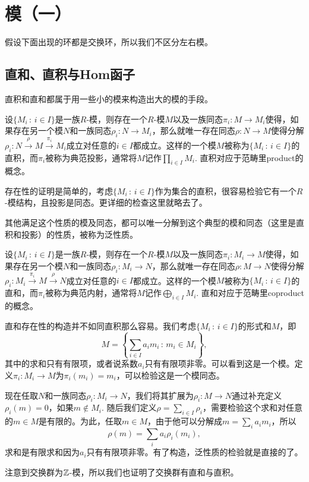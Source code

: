 \chapter{模（一）}
假设下面出现的环都是交换环，所以我们不区分左右模。
\section{直和、直积与Hom函子}

直积和直和都属于用一些小的模来构造出大的模的手段。

\para 设$\{M_i\,:\, i\in I\}$是一族$R$-模，则存在一个$R$-模$M$以及一族同态$\pi_i:M\to M_i$使得，如果存在另一个模$N$和一族同态$\rho_i:N\to M_i$，那么就唯一存在同态$\rho:N\to M$使得分解$\rho_i:N\xrightarrow{\rho} M \xrightarrow{\pi_i} M_i$成立对任意的$i\in I$都成立。这样的一个模$M$被称为$\{M_i\,:\, i\in I\}$的直积，而$\pi_i$被称为典范投影，通常将$M$记作$\prod_{i\in I}M_i$. 直积对应于范畴里product的概念。

存在性的证明是简单的，考虑$\{M_i\,:\, i\in I\}$作为集合的直积，很容易检验它有一个$R$-模结构，且投影是同态。更详细的检查这里就略去了。

其他满足这个性质的模及同态，都可以唯一分解到这个典型的模和同态（这里是直积和投影）的性质，被称为泛性质。

\para 设$\{M_i\,:\, i\in I\}$是一族$R$-模，则存在一个$R$-模$M$以及一族同态$\pi_i:M_i\to M$使得，如果存在另一个模$N$和一族同态$\rho_i:M_i\to N$，那么就唯一存在同态$\rho:M\to N$使得分解$\rho_i:M_i\xrightarrow{\pi_i} M \xrightarrow{\rho} N$成立对任意的$i\in I$都成立。这样的一个模$M$被称为$\{M_i\,:\, i\in I\}$的直和，而$\pi_i$被称为典范内射，通常将$M$记作$\bigoplus_{i\in I}M_i$. 直和对应于范畴里coproduct的概念。

直和存在性的构造并不如同直积那么容易。我们考虑$\{M_i\,:\, i\in I\}$的形式和$M$，即
\[
	M=\left\{\sum_{i\in I} a_i m_i\,:\, m_i\in M_i\right\},
\]
其中的求和只有有限项，或者说系数$a_i$只有有限项非零。可以看到这是一个模。定义$\pi_i:M_i\to M$为$\pi_i(m_i)=m_i$，可以检验这是一个模同态。

现在任取$N$和一族同态$\rho_i:M_i\to N$，我们将其扩展为$\rho_i:M\to N$通过补充定义$\rho_i(m)=0$，如果$m\notin M_i$. 随后我们定义$\rho = \sum_{i\in I} \rho_i$，需要检验这个求和对任意的$m\in M$是有限的。为此，任取$m\in M$，由于他可以分解成$m=\sum_i a_i m_i$，所以
\[
	\rho(m)=\sum_i a_i \rho_i(m_i),
\]
求和是有限求和因为$a_i$只有有限项非零。有了构造，泛性质的检验就是直接的了。

注意到交换群为$\mathbb{Z}$-模，所以我们也证明了交换群有直和与直积。

